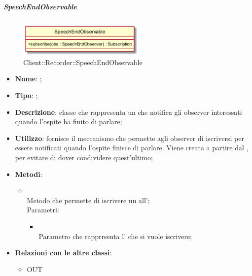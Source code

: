 \hypertarget{SpeechEndObservable_label}{\subparagraph{SpeechEndObservable}}
\begin{figure}[h]
	\centering
	\includegraphics[width=0.55\textwidth,height=\textheight,keepaspectratio]{images/ClassSpeechEndObservable.png}
	\caption{Client::Recorder::SpeechEndObservable}
\end{figure}
\begin{itemize}
	\item \textbf{Nome}: ;
	\item \textbf{Tipo}: ;
	\item \textbf{Descrizione}: classe che rappresenta un  che notifica gli observer interessati quando l'ospite ha finito di parlare;
	\item \textbf{Utilizzo}: fornisce il meccanismo che permette agli observer di iscriversi per essere notificati quando l'ospite finisce di parlare. Viene creata a partire dal , per evitare di dover condividere quest'ultimo;
	\item \textbf{Metodi}:
	\begin{itemize}
		\item[]  \\		Metodo che permette di iscrivere un  all';\\
		Parametri:
		\begin{itemize}
			\item {} \\
			Parametro che rapprrsenta l' che si vuole iscrivere;
		\end{itemize}
	\end{itemize}
	\item \textbf{Relazioni con le altre classi}:
	\begin{itemize}
		\item OUT \hyperlink{LogicObserver_label}{}
	\end{itemize}
\end{itemize}
\FloatBarrier

